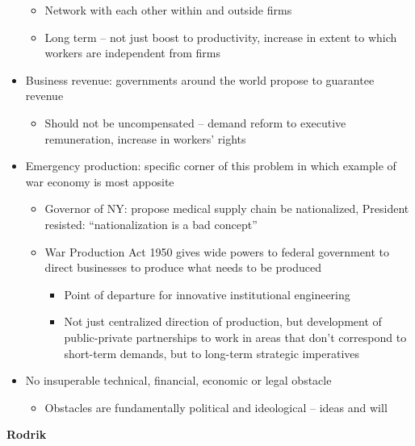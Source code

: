 \begin{itemize}
  \begin{itemize}
  \tightlist
  \item
    Network with each other within and outside firms
  \item
    Long term -- not just boost to productivity, increase in extent to
    which workers are independent from firms
  \end{itemize}
\item
  Business revenue: governments around the world propose to guarantee
  revenue

  \begin{itemize}
  \tightlist
  \item
    Should not be uncompensated -- demand reform to executive
    remuneration, increase in workers' rights
  \end{itemize}
\item
  Emergency production: specific corner of this problem in which example
  of war economy is most apposite

  \begin{itemize}
  \tightlist
  \item
    Governor of NY: propose medical supply chain be nationalized,
    President resisted: ``nationalization is a bad concept''
  \item
    War Production Act 1950 gives wide powers to federal government to
    direct businesses to produce what needs to be produced

    \begin{itemize}
    \tightlist
    \item
      Point of departure for innovative institutional engineering
    \item
      Not just centralized direction of production, but development of
      public-private partnerships to work in areas that don't correspond
      to short-term demands, but to long-term strategic imperatives
    \end{itemize}
  \end{itemize}
\item
  No insuperable technical, financial, economic or legal obstacle

  \begin{itemize}
  \tightlist
  \item
    Obstacles are fundamentally political and ideological -- ideas and
    will
  \end{itemize}
\end{itemize}

\textbf{Rodrik}

